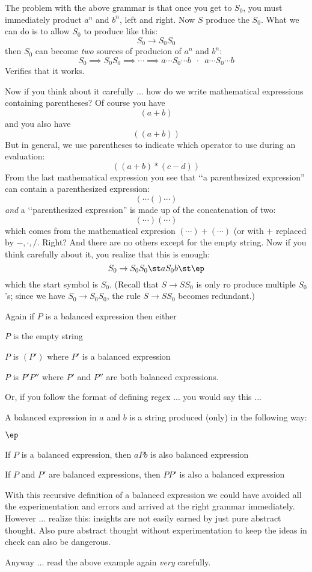 \begin{eg}
The problem with the above grammar is that once you get to $S_0$, you must
immediately product $a^n$ and $b^n$, left and right.
Now $S$ produce the $S_0$.
What we can do is to allow $S_0$ to produce like this:
\[
S_0 \rightarrow S_0 S_0
\]
then $S_0$ can become \textit{ two} sources of producion of $a^n$ and $b^n$:
\[
S_0 \implies S_0 S_0 \implies \cdots \implies 
a \cdots S_0 \cdots b \,\,\, \cdot \,\,\, a \cdots S_0 \cdots b 
\]
Verifies that it works.

Now if you think about it carefully ... 
how do we write mathematical expressions containing parentheses?
Of course you have 
\[
(a + b)
\]
and you also have
\[
((a + b))
\]
But in general, we use parentheses to indicate which operator to use
during an evaluation:
\[
((a+b)*(c - d))
\]
From the last mathematical expression you see that \lq\lq a parenthesized 
expression'' can contain a parenthesized expression:
\[
( \cdots () \cdots )
\]
\textit{ and} a \lq\lq parenthesized expression'' is made up of the concatenation
of two:
\[
( \cdots ) 
( \cdots ) 
\]
which comes from the mathematical expresion $( \cdots ) + ( \cdots )$
(or with $+$ replaced by $-, \cdot, /$. Right?
And there are no others except for the empty string.
Now if you think carefully about it, you realize that this is enough:
\[
S_0 \rightarrow S_0 S_0 \st aS_0b \st \ep
\]
which the start symbol is $S_0$.
(Recall that $S \rightarrow S S_0$ is only ro produce multiple $S_0$'s;
since we have $S_0 \rightarrow S_0 S_0$, the rule $S \rightarrow S S_0$
becomes redundant.)

Again if $P$ is a balanced expression then either
\begin{tightlist}
\item $P$ is the empty string
\item $P$ is $(P')$ where $P'$ is a balanced expression
\item $P$ is $P'P''$ where $P'$ and $P''$ are both balanced expressions.
\end{tightlist}
Or, if you follow the format of defining regex ... you would say this ...

A balanced expression in $a$ and $b$ is a string produced (only) 
in the following way:
\begin{tightlist}
\item $\ep$
\item If $P$ is a balanced expression, then $aPb$ is also balanced expression
\item If $P$ and $P'$ are balanced expressions, then 
      $PP'$ is also a balanced expression
\end{tightlist}

With this recursive definition of a balanced expression we could have avoided
all the experimentation and errors and arrived at the right grammar 
immediately.
However ... realize this:
insights are not easily earned by just pure abstract thought.
Also pure abstract thought without experimentation to keep the ideas in check
can also be dangerous.

Anyway ... read the above example again \textit{ very} carefully.
\end{eg}




